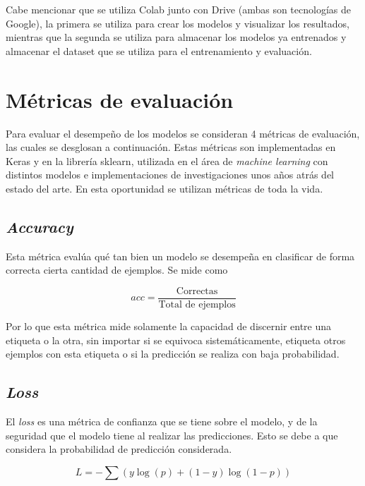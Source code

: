         Cabe mencionar que se utiliza Colab junto con Drive (ambas son tecnologías de Google), la primera se utiliza para crear los modelos y visualizar los resultados, mientras que la segunda se utiliza para almacenar los modelos ya entrenados y almacenar el dataset que se utiliza para el entrenamiento y evaluación.

\section{Métricas de evaluación}
    
    Para evaluar el desempeño de los modelos se consideran 4 métricas de evaluación, las cuales se desglosan a continuación. Estas métricas son implementadas en Keras y en la librería sklearn, utilizada en el área de \textit{machine learning} con distintos modelos e implementaciones de investigaciones unos años atrás del estado del arte. En esta oportunidad se utilizan métricas de toda la vida.
    
    \subsection{\textit{Accuracy}}
    
        Esta métrica evalúa qué tan bien un modelo se desempeña en clasificar de forma correcta cierta cantidad de ejemplos. Se mide como
        
        \begin{equation}
            acc = \frac{\text{Correctas}}{\text{Total de ejemplos}}
        \end{equation}
        
        Por lo que esta métrica mide solamente la capacidad de discernir entre una etiqueta o la otra, sin importar si se equivoca sistemáticamente, etiqueta otros ejemplos con esta etiqueta o si la predicción se realiza con baja probabilidad.
    
    \subsection{\textit{Loss}}
        
        El \textit{loss} es una métrica de confianza que se tiene sobre el modelo, y de la seguridad que el modelo tiene al realizar las predicciones. Esto se debe a que considera la probabilidad de predicción considerada.
        
        \begin{equation}
            L = - \sum (y\log(p) + (1-y)\log(1-p))
        \label{eqn:log}
        \end{equation}
        
